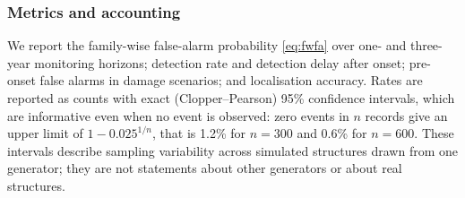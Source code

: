 \documentclass[12pt,a4paper]{article}
\newcommand{\rev}[1]{#1}
\newcommand{\rev}[1]{{\color{revcol}#1}}
\begin{document}
\subsubsection{Metrics and accounting}\label{sec:metrics}

We report the family-wise false-alarm probability \eqref{eq:fwfa} over one- and three-year monitoring horizons; detection rate and detection delay after onset; pre-onset false alarms in damage scenarios; and localisation accuracy. \rev{Rates are reported as counts with exact (Clopper--Pearson) 95\% confidence intervals, which are informative even when no event is observed: zero events in $n$ records give an upper limit of $1-0.025^{1/n}$, that is 1.2\% for $n=300$ and 0.6\% for $n=600$.} \rev{These intervals describe sampling variability across simulated structures drawn from one generator; they are not statements about other generators or about real structures.}
\end{document}
